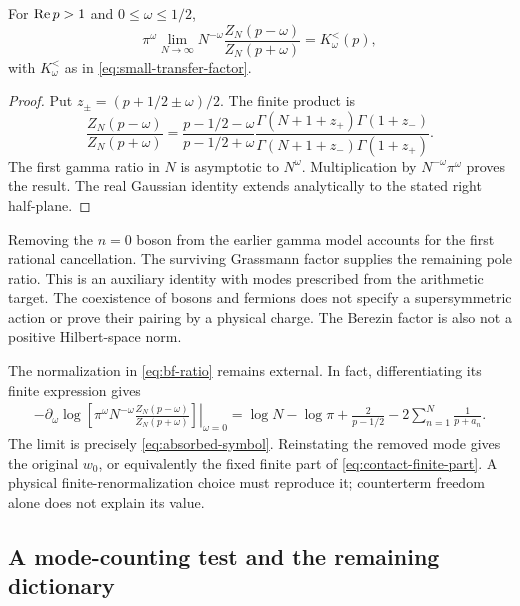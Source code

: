 \begin{proposition}
\label{prop:bf-ratio}
For $\operatorname{Re} p>1$ and $0\le\omega\le1/2$,
\begin{equation}\label{eq:bf-ratio}
 \pi^\omega\lim_{N\to\infty}N^{-\omega}
 \frac{Z_N(p-\omega)}{Z_N(p+\omega)}
 =K_\omega^{<}(p),
\end{equation}
with $K_\omega^{<}$ as in \eqref{eq:small-transfer-factor}.
\end{proposition}
\begin{proof}
Put $z_\pm=(p+1/2\pm\omega)/2$.
The finite product is
\begin{equation}
 \frac{Z_N(p-\omega)}{Z_N(p+\omega)}
 =
 \frac{p-1/2-\omega}{p-1/2+\omega}
 \frac{\Gamma(N+1+z_+)\Gamma(1+z_-)}
      {\Gamma(N+1+z_-)\Gamma(1+z_+)}.
\end{equation}
The first gamma ratio in $N$ is asymptotic to $N^\omega$.
Multiplication by $N^{-\omega}\pi^\omega$ proves the result.
The real Gaussian identity extends analytically to the
stated right half-plane.
\end{proof}

Removing the $n=0$ boson from the earlier gamma model
accounts for the first rational cancellation. The surviving
Grassmann factor supplies the remaining pole ratio.
This is an auxiliary identity with modes prescribed from
the arithmetic target. The coexistence of bosons and
fermions does not specify a supersymmetric action or prove
their pairing by a physical charge. The Berezin factor is
also not a positive Hilbert-space norm.

The normalization in \eqref{eq:bf-ratio} remains external.
In fact, differentiating its finite expression gives
\begin{align}
 -\left.\partial_\omega\log\left[
 \pi^\omega N^{-\omega}
 \frac{Z_N(p-\omega)}{Z_N(p+\omega)}\right]\right|_{\omega=0}
 =\log N-\log\pi+\frac2{p-1/2}
       -2\sum_{n=1}^N\frac1{p+a_n}.
\end{align}
The limit is precisely \eqref{eq:absorbed-symbol}. Reinstating
the removed mode gives the original $w_0$, or equivalently
the fixed finite part of \eqref{eq:contact-finite-part}.
A physical finite-renormalization choice must reproduce it;
counterterm freedom alone does not explain its value.

\subsection{A mode-counting test and the remaining dictionary}
\label{subsec:mode-count}

